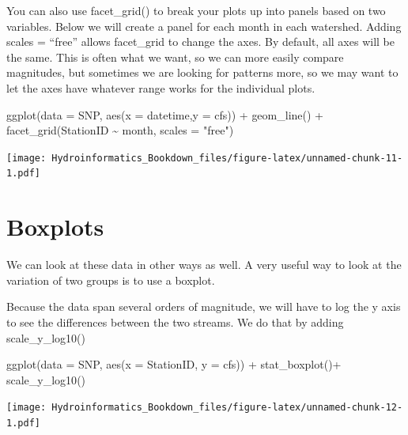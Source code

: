 \documentclass[
]{book}
\newenvironment{Shaded}{\begin{snugshade}}{\end{snugshade}}
\newcommand{\AttributeTok}[1]{\textcolor[rgb]{0.77,0.63,0.00}{#1}}
\newcommand{\FunctionTok}[1]{\textcolor[rgb]{0.00,0.00,0.00}{#1}}
\newcommand{\NormalTok}[1]{#1}
\newcommand{\SpecialCharTok}[1]{\textcolor[rgb]{0.00,0.00,0.00}{#1}}
\newcommand{\StringTok}[1]{\textcolor[rgb]{0.31,0.60,0.02}{#1}}
\begin{document}
You can also use facet\_grid() to break your plots up into panels based on two variables. Below we will create a panel for each month in each watershed. Adding scales = ``free'' allows facet\_grid to change the axes. By default, all axes will be the same. This is often what we want, so we can more easily compare magnitudes, but sometimes we are looking for patterns more, so we may want to let the axes have whatever range works for the individual plots.

\begin{Shaded}
\begin{Highlighting}[]
\FunctionTok{ggplot}\NormalTok{(}\AttributeTok{data =}\NormalTok{ SNP, }\FunctionTok{aes}\NormalTok{(}\AttributeTok{x =}\NormalTok{ datetime,}\AttributeTok{y =}\NormalTok{ cfs)) }\SpecialCharTok{+}
  \FunctionTok{geom\_line}\NormalTok{() }\SpecialCharTok{+}
  \FunctionTok{facet\_grid}\NormalTok{(StationID }\SpecialCharTok{\textasciitilde{}}\NormalTok{ month, }\AttributeTok{scales =} \StringTok{"free"}\NormalTok{)}
\end{Highlighting}
\end{Shaded}

\texttt{[image: Hydroinformatics\_Bookdown\_files/figure-latex/unnamed-chunk-11-1.pdf]}

\hypertarget{boxplots}{%
\section{Boxplots}\label{boxplots}}

We can look at these data in other ways as well. A very useful way to look at the variation of two groups is to use a boxplot.

Because the data span several orders of magnitude, we will have to log the y axis to see the differences between the two streams. We do that by adding scale\_y\_log10()

\begin{Shaded}
\begin{Highlighting}[]
\FunctionTok{ggplot}\NormalTok{(}\AttributeTok{data =}\NormalTok{ SNP, }\FunctionTok{aes}\NormalTok{(}\AttributeTok{x =}\NormalTok{ StationID, }\AttributeTok{y =}\NormalTok{ cfs)) }\SpecialCharTok{+} 
  \FunctionTok{stat\_boxplot}\NormalTok{()}\SpecialCharTok{+}
  \FunctionTok{scale\_y\_log10}\NormalTok{()}
\end{Highlighting}
\end{Shaded}

\texttt{[image: Hydroinformatics\_Bookdown\_files/figure-latex/unnamed-chunk-12-1.pdf]}
\end{document}
